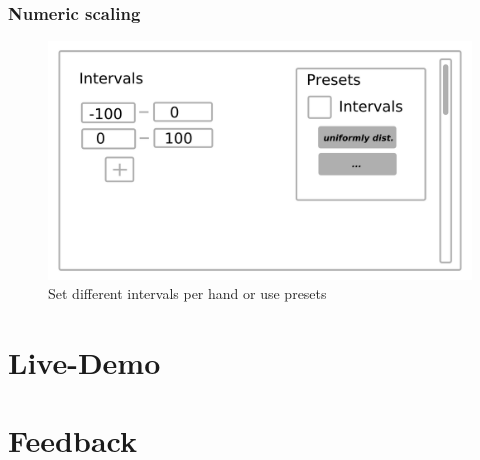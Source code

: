 \documentclass[]{beamer}
\begin{document}
	\begin{frame}
		\frametitle{Numeric scaling}
		\begin{figure}[H]
			\includegraphics[width=\linewidth]{../mock_up/num.png}
			\caption{Set different intervals per hand or use presets}
			\label{fig:p1}
		\end{figure}
	\end{frame}

\section[]{Live-Demo}

\section[]{Feedback}
\end{document}

